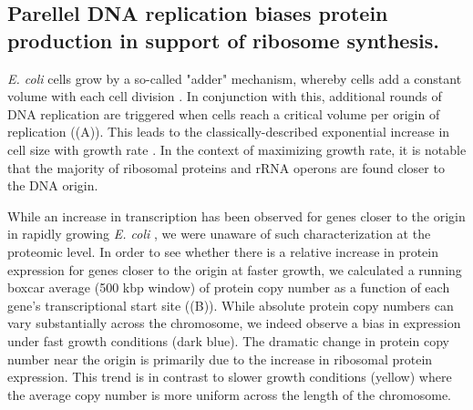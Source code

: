 %
%

\subsection{Parellel DNA replication biases protein production in support of ribosome synthesis.}

\textit{E. coli} cells grow by a so-called "adder" mechanism, whereby cells add
a constant volume with each cell division \citep{taheriaraghi2015}. In
conjunction with this, additional rounds of DNA replication are triggered when
cells reach a critical volume per origin of replication
((A)). This leads to the classically-described
exponential increase in cell size with growth rate \cite{schaechter1958, si2017,
si2019}. In the context of maximizing growth rate, it is notable that the
majority of ribosomal proteins and rRNA operons are found closer to the DNA
origin.


While an increase in transcription has been observed for genes closer to the
origin in rapidly growing \textit{E. coli} \citep{scholz2019}, we were unaware
of such characterization at the proteomic level. In order to see whether there
is a relative increase in protein expression for genes closer to the origin at
faster growth, we calculated a running boxcar average (500 kbp window) of
protein copy number as a function of each gene's transcriptional start site
((B)). While absolute protein copy numbers can vary
substantially across the chromosome, we indeed observe a bias in expression
under fast growth conditions (dark blue). The dramatic change in protein copy
number near the origin is primarily due to the increase in ribosomal protein
expression. This trend is in contrast to slower growth conditions (yellow) where
the average copy number is more uniform across the length of the chromosome.

